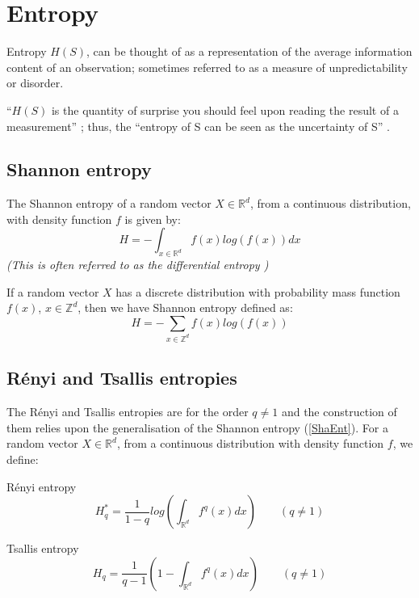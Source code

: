 \documentclass[12pt]{report}
\begin{document}
\section{Entropy}

Entropy $H(S)$, can be thought of as a representation of the average information content of an observation; sometimes referred to as a measure of unpredictability or disorder. 

``$H(S)$ is the quantity of surprise you should feel upon reading the result of a measurement'' \cite{entdef}; thus, the ``entropy of S can be seen as the uncertainty of S'' \cite{paper7}.

\subsection{Shannon entropy}
The Shannon entropy of a random vector $X \in \mathbb{R}^d$, from a continuous distribution, with density function $f$ is given by:
\begin{equation} \label{ShaEnt}
H = - \int_{x \in \mathbb{R}^d} f(x) log(f(x)) dx 
\end{equation}
\textit{(This is often referred to as the differential entropy \cite{book2})}

If a random vector $X$ has a discrete distribution with probability mass function $f(x)$, $x \in \mathbb{Z}^d$, then we have Shannon entropy defined as:
\begin{equation} 
H = - \sum_{x \in \mathbb{Z}^{d}} f(x) log(f(x)) \nonumber
\end{equation}



\subsection{R\'enyi and Tsallis entropies}
The R\'enyi and Tsallis entropies are for the order $q \neq 1$ and the construction of them relies upon the generalisation of the Shannon entropy (\ref{ShaEnt}). For a random vector $X \in \mathbb{R}^d$, from a continuous distribution with density function $f$, we define:

R\'enyi entropy
\begin{equation} \label{RenEnt} 
H_{q}^{*} = \frac{1}{1-q} log \left( \int_{\mathbb{R}^d} f^q (x) dx \right) \quad  \quad (q \neq 1) 
\end{equation}

Tsallis entropy
\begin{equation} \label{TsaEnt} 
H_{q} = \frac{1}{q-1} \left(1 - \int_{\mathbb{R}^d} f^q (x) dx \right)  \quad  \quad (q \neq 1) 
\end{equation} 
\end{document}
